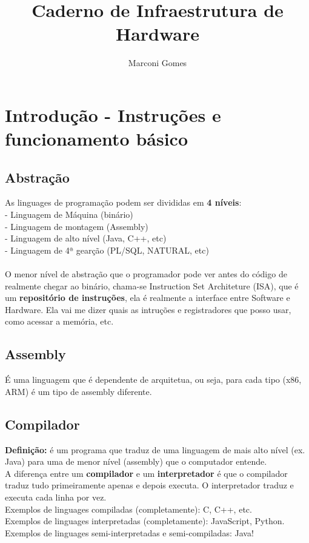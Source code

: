 \documentclass[12pt]{article}
\begin{document}
\nocite{*}

\title{Caderno de Infraestrutura de Hardware}
\author{Marconi Gomes}

\maketitle


\section{Introdução - Instruções e funcionamento básico}
    \subsection{Abstração}
    As linguages de programação podem ser divididas em \textbf{4 níveis}:
    \\- Linguagem de Máquina (binário)
    \\- Linguagem de montagem (Assembly)
    \\- Linguagem de alto nível (Java, C++, etc)
    \\- Linguagem de 4ª gearção (PL/SQL, NATURAL, etc)
    \\~\\O menor nível de abstração que o programador pode ver antes do código de realmente chegar ao binário, chama-se Instruction Set Architeture (ISA), que é um \textbf{repositório de instruções}, ela é realmente a interface entre Software e Hardware. Ela vai me dizer quais as intruções e registradores que posso usar, como acessar a memória, etc.

    \subsection{Assembly}
    É uma linguagem que é dependente de arquitetua, ou seja, para cada tipo (x86, ARM) é um tipo de assembly diferente.

    \subsection{Compilador}
    \textbf{Definição:} é um programa que traduz de uma linguagem de mais alto nível (ex. Java) para uma de menor nível (assembly) que o computador entende.
    \\A diferença entre um \textbf{compilador} e um \textbf{interpretador} é que o compilador traduz tudo primeiramente apenas e depois executa. O interpretador traduz e executa cada linha por vez. 
    \\Exemplos de linguages compiladas (completamente): C, C++, etc.
    \\Exemplos de linguages interpretadas (completamente): JavaScript, Python.
    \\Exemplos de linguages semi-interpretadas e semi-compiladas: Java!
\end{document}
